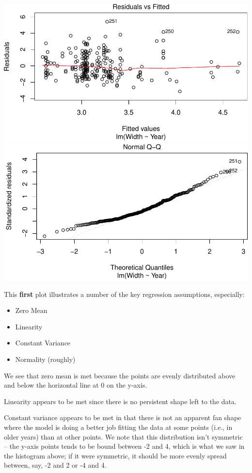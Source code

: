 \documentclass[]{article}
\providecommand{\tightlist}{%
  \setlength{\itemsep}{0pt}\setlength{\parskip}{0pt}}
\begin{document}
\includegraphics{02_Activity_AfterClass_files/figure-latex/unnamed-chunk-3-1.pdf}
\includegraphics{02_Activity_AfterClass_files/figure-latex/unnamed-chunk-3-2.pdf}

This \textbf{first} plot illustrates a number of the key regression
assumptions, especially:

\begin{itemize}
\tightlist
\item
  Zero Mean
\item
  Linearity
\item
  Constant Variance
\item
  Normality (roughly)
\end{itemize}

We see that zero mean is met because the points are evenly distributed
above and below the horizontal line at 0 on the y-axis.

Linearity appears to be met since there is no persistent shape left to
the data.

Constant variance appears to be met in that there is not an apparent fan
shape where the model is doing a better job fitting the data at some
points (i.e., in older years) than at other points. We note that this
distribution isn't symmetric -- the y-axis points tends to be bound
between -2 and 4, which is what we saw in the histogram above; if it
were symmetric, it should be more evenly spread between, say, -2 and 2
or -4 and 4.
\end{document}
